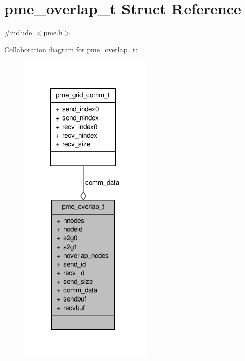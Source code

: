 \hypertarget{structpme__overlap__t}{\section{pme\-\_\-overlap\-\_\-t \-Struct \-Reference}
\label{structpme__overlap__t}
}


{\ttfamily \#include $<$pme.\-h$>$}



\-Collaboration diagram for pme\-\_\-overlap\-\_\-t\-:
\nopagebreak
\begin{figure}[H]
\begin{center}
\leavevmode
\includegraphics[width=183pt]{structpme__overlap__t__coll__graph}
\end{center}
\end{figure}
